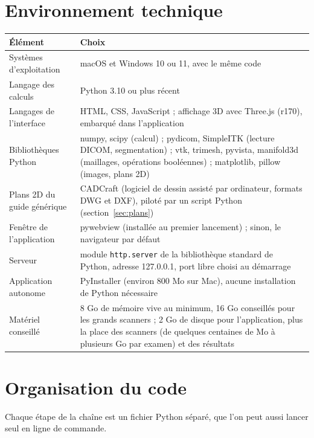 \documentclass[11pt,a4paper]{article}
\newcommand{\fichier}[1]{\texttt{\small #1}}
\begin{document}
\section{Environnement technique}

\begin{tabularx}{\textwidth}{@{}lX@{}}
\toprule
\textbf{Élément} & \textbf{Choix} \\ \midrule
Systèmes d'exploitation & macOS et Windows 10 ou 11, avec le même code \\
Langage des calculs & Python 3.10 ou plus récent \\
Langages de l'interface & HTML, CSS, JavaScript ; affichage 3D avec Three.js (r170), embarqué dans l'application \\
Bibliothèques Python & numpy, scipy (calcul) ; pydicom, SimpleITK (lecture DICOM, segmentation) ; vtk, trimesh,
  pyvista, manifold3d (maillages, opérations booléennes) ; matplotlib, pillow (images, plans 2D) \\
Plans 2D du guide générique & CADCraft (logiciel de dessin assisté par ordinateur, formats DWG et DXF), piloté par
  un script Python (section~\ref{sec:plans}) \\
Fenêtre de l'application & pywebview (installée au premier lancement) ; sinon, le navigateur par défaut \\
Serveur & module \fichier{http.server} de la bibliothèque standard de Python, adresse 127.0.0.1, port libre choisi
  au démarrage \\
Application autonome & PyInstaller (environ 800 Mo sur Mac), aucune installation de Python nécessaire \\
Matériel conseillé & 8 Go de mémoire vive au minimum, 16 Go conseillés pour les grands scanners ; 2 Go de disque pour
  l'application, plus la place des scanners (de quelques centaines de Mo à plusieurs Go par examen) et des
  résultats \\
\bottomrule
\end{tabularx}

\section{Organisation du code}

Chaque étape de la chaîne est un fichier Python séparé, que l'on peut aussi lancer seul en ligne de commande.
\end{document}

